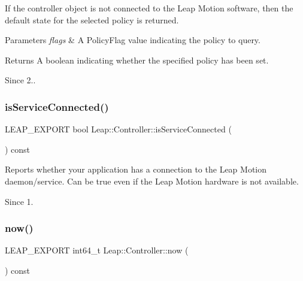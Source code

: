 If the controller object is not connected to the Leap Motion software, then the default state for the selected policy is returned.


\begin{DoxyCodeInclude}
\end{DoxyCodeInclude}



\begin{DoxyParams}{Parameters}
{\em flags} & A Policy\+Flag value indicating the policy to query. \\
\hline
\end{DoxyParams}
\begin{DoxyReturn}{Returns}
A boolean indicating whether the specified policy has been set. 
\end{DoxyReturn}
\begin{DoxySince}{Since}
2.. 
\end{DoxySince}
\mbox{\label{class_leap_1_1_controller_a5162678b59f1b08b5ffb33c3a8754a76}} 
\subsubsection{\texorpdfstring{is\+Service\+Connected()}{isServiceConnected()}}
{\footnotesize\ttfamily L\+E\+A\+P\+\_\+\+E\+X\+P\+O\+RT bool Leap\+::\+Controller\+::is\+Service\+Connected (\begin{DoxyParamCaption}{ }\end{DoxyParamCaption}) const}

Reports whether your application has a connection to the Leap Motion daemon/service. Can be true even if the Leap Motion hardware is not available. \begin{DoxySince}{Since}
1. 
\end{DoxySince}
\mbox{\label{class_leap_1_1_controller_a2ffddad8225cfb99452d3f62ae3f7e77}} 
\subsubsection{\texorpdfstring{now()}{now()}}
{\footnotesize\ttfamily L\+E\+A\+P\+\_\+\+E\+X\+P\+O\+RT int64\+\_\+t Leap\+::\+Controller\+::now (\begin{DoxyParamCaption}{ }\end{DoxyParamCaption}) const}

